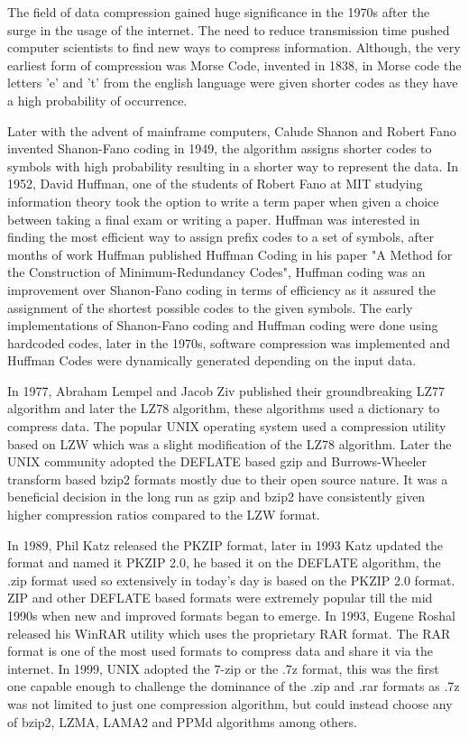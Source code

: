 \documentclass{article}
\begin{document}
The field of data compression gained huge significance in the 1970s after the surge in the usage of the internet. The need to reduce transmission time pushed computer scientists to find new ways to compress information. Although, the very earliest form of compression was Morse Code, invented in 1838, in Morse code the letters 'e' and 't' from the english language were given shorter codes as they have a high probability of occurrence.

Later with the advent of mainframe computers, Calude Shanon and Robert Fano invented Shanon-Fano coding in 1949\cite{shannon1948mathematical}, the algorithm assigns shorter codes to symbols with high probability resulting in a shorter way to represent the data. In 1952, David Huffman, one of the students of Robert Fano at MIT studying information theory took the option to write a term paper when given a choice between taking a final exam or writing a paper. Huffman was interested in finding the most efficient way to assign prefix codes to a set of symbols, after months of work Huffman published Huffman Coding in his paper "A Method for the Construction of Minimum-Redundancy Codes"\cite{huffman1952method}, Huffman coding was an improvement over Shanon-Fano coding in terms of efficiency as it assured the assignment of the shortest possible codes to the given symbols. The early implementations of Shanon-Fano coding and Huffman coding were done using hardcoded codes, later in the 1970s, software compression was implemented and Huffman Codes were dynamically generated depending on the input data.

In 1977, Abraham Lempel and Jacob Ziv published\cite{ziv1977universal} their groundbreaking LZ77 algorithm and later the LZ78 algorithm, these algorithms used a dictionary to compress data. The popular UNIX operating system used a compression utility based on LZW which was a slight modification of the LZ78 algorithm. Later the UNIX community adopted the DEFLATE based gzip and Burrows-Wheeler transform based bzip2 formats mostly due to their open source nature\cite{burrows1994block}. It was a beneficial decision in the long run as gzip and bzip2 have consistently given higher compression ratios compared to the LZW format.


In 1989, Phil Katz released the PKZIP format, later in 1993 Katz updated the format and named it PKZIP 2.0, he based it on the DEFLATE algorithm, the .zip format used so extensively in today's day is  based on the PKZIP 2.0 format. ZIP and other DEFLATE based formats were extremely popular till the mid 1990s when new and improved formats began to emerge. In 1993, Eugene Roshal released his WinRAR utility which uses the proprietary RAR format. The RAR format is one of the most used formats to compress data and share it via the internet. In 1999, UNIX adopted the 7-zip or the .7z format, this was the first one capable enough to challenge the dominance of the .zip and .rar formats as .7z was not limited to just one compression algorithm, but could instead choose any of bzip2, LZMA, LAMA2 and PPMd algorithms among others. 
\end{document}

